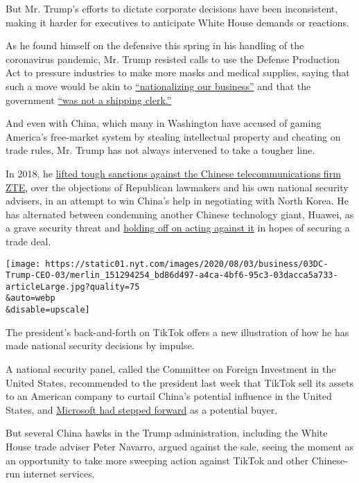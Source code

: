 But Mr. Trump's efforts to dictate corporate decisions have been
inconsistent, making it harder for executives to anticipate White House
demands or reactions.

As he found himself on the defensive this spring in his handling of the
coronavirus pandemic, Mr. Trump resisted calls to use the Defense
Production Act to pressure industries to make more masks and medical
supplies, saying that such a move would be akin to
\href{https://www.nytimes.com/2020/03/31/us/politics/coronavirus-defense-production-act.html}{``nationalizing
our business''} and that the government
\href{https://www.nytimes.com/2020/03/20/us/politics/trump-coronavirus-supplies.html}{``was
not a shipping clerk.''}

And even with China, which many in Washington have accused of gaming
America's free-market system by stealing intellectual property and
cheating on trade rules, Mr. Trump has not always intervened to take a
tougher line.

In 2018, he
\href{https://www.nytimes.com/2018/06/07/business/us-china-zte-deal.html}{lifted
tough sanctions against the Chinese telecommunications firm ZTE}, over
the objections of Republican lawmakers and his own national security
advisers, in an attempt to win China's help in negotiating with North
Korea. He has alternated between condemning another Chinese technology
giant, Huawei, as a grave security threat and
\href{https://www.nytimes.com/2019/11/15/business/us-reprieve-huawei.html}{holding
off on acting against it} in hopes of securing a trade deal.

\texttt{[image: https://static01.nyt.com/images/2020/08/03/business/03DC-Trump-CEO-03/merlin\_151294254\_bd86d497-a4ca-4bf6-95c3-03dacca5a733-articleLarge.jpg?quality=75\\\&auto=webp\\\&disable=upscale]}

The president's back-and-forth on TikTok offers a new illustration of
how he has made national security decisions by impulse.

A national security panel, called the Committee on Foreign Investment in
the United States, recommended to the president last week that TikTok
sell its assets to an American company to curtail China's potential
influence in the United States, and
\href{https://www.nytimes.com/2020/07/31/technology/tiktok-microsoft.html}{Microsoft
had stepped forward} as a potential buyer.

But several China hawks in the Trump administration, including the White
House trade adviser Peter Navarro, argued against the sale, seeing the
moment as an opportunity to take more sweeping action against TikTok and
other Chinese-run internet services.

